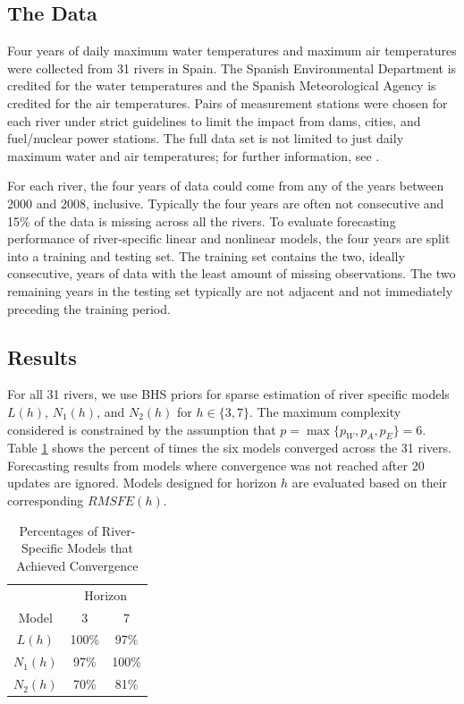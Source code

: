  
 
 
 \vskip 3mm
 
 \subsection{The Data} 
 
Four years of daily maximum water temperatures and maximum air temperatures were collected from 31 rivers in Spain. The Spanish Environmental Department is credited for the water temperatures and the Spanish Meteorological Agency is credited for the air temperatures. Pairs of measurement stations were chosen for each river under strict guidelines to limit the impact from dams, cities, and fuel/nuclear power stations. The full data set is not limited to just daily maximum water and air temperatures; for further information, see \cite{Kamarianakis2016}.
 
For each river, the four years of data could come from any of the years between 2000 and 2008, inclusive. Typically the four years are often not consecutive and 15\% of the data is missing across all the rivers. To evaluate forecasting performance of river-specific linear and nonlinear models, the four years are split into a training and testing set. The training set contains the two, ideally consecutive, years of data with the least amount of missing observations. The two remaining years in the testing set typically are not adjacent and not immediately preceding the training period. 

\vskip 3mm

\subsection{Results}

For all 31 rivers, we use BHS priors for sparse estimation of river specific models $L(h)$, $N_1(h)$, and $N_2(h)$ for $h \in \{3,7\}$. The maximum complexity considered is constrained by the assumption that $p=\max \{p_W, p_A, p_E\}=6$. Table \ref{tab:convriv} shows the percent of times the six models converged across the 31 rivers. Forecasting results from models where convergence was not reached after 20 updates are ignored. Models designed for horizon $h$ are evaluated based on their corresponding $RMSFE(h)$.

\begin{table}[!h]
	\small
  \centering
  \caption{ Percentages of River-Specific Models that Achieved Convergence }
    \begin{tabular}{ccc}
    \toprule
    &  \multicolumn{2}{c}{Horizon}  \\
    Model & 3 & 7\\
    \midrule
    $L(h)$ &  100\% & 97\%\\
    $N_1(h)$ & 97\% & 100\%\\
    $N_2(h)$ & 70\% & 81\%\\
    \bottomrule
    \end{tabular}%
  \label{tab:convriv}%
\end{table}%

